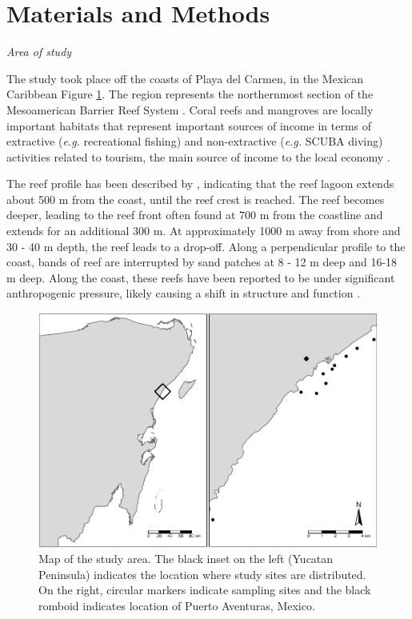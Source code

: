 \documentclass[fleqn,10pt,lineno]{wlpeerj} %
\theoremstyle{definition}
\theoremstyle{definition}
\theoremstyle{definition}
\theoremstyle{remark}
\begin{document}
\clearpage

\section{Materials and Methods}\label{materials-and-methods}

\emph{Area of study}

The study took place off the coasts of Playa del Carmen, in the Mexican
Caribbean Figure \ref{fig:map}. The region represents the northernmost
section of the Mesoamerican Barrier Reef System \citep{ruizzarate_2004}.
Coral reefs and mangroves are locally important habitats that represent
important sources of income in terms of extractive (\emph{e.g.}
recreational fishing) and non-extractive (\emph{e.g.} SCUBA diving)
activities related to tourism, the main source of income to the local
economy \citep{murray_2007}.

The reef profile has been described by \citet{ariasgonzalez_1998},
indicating that the reef lagoon extends about 500 m from the coast,
until the reef crest is reached. The reef becomes deeper, leading to the
reef front often found at 700 m from the coastline and extends for an
additional 300 m. At approximately 1000 m away from shore and 30 - 40 m
depth, the reef leads to a drop-off. Along a perpendicular profile to
the coast, bands of reef are interrupted by sand patches at 8 - 12 m
deep and 16-18 m deep. Along the coast, these reefs have been reported
to be under significant anthropogenic pressure, likely causing a shift
in structure and function \citep{bozec_2008}.

\begin{figure}
\centering
\includegraphics{Manuscript_files/figure-latex/unnamed-chunk-1-1.pdf}
\caption{\label{fig:unnamed-chunk-1}\label{fig:map}Map of the study area.
The black inset on the left (Yucatan Peninsula) indicates the location
where study sites are distributed. On the right, circular markers
indicate sampling sites and the black romboid indicates location of
Puerto Aventuras, Mexico.}
\end{figure}
\end{document}
